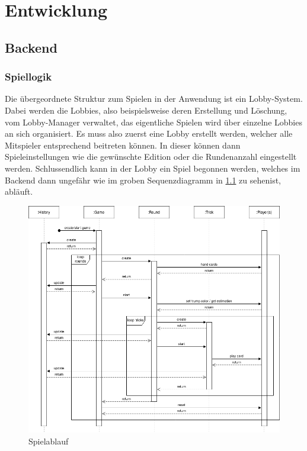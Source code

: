 \chapter{Entwicklung}

\section{Backend}

\subsection{Spiellogik}

Die übergeordnete Struktur zum Spielen in der Anwendung ist ein Lobby-System. Dabei werden die Lobbies, also beispielsweise deren Erstellung und Löschung, vom Lobby-Manager verwaltet, das eigentliche Spielen wird über einzelne Lobbies an sich organisiert. Es muss also zuerst eine Lobby erstellt werden, welcher alle Mitspieler entsprechend beitreten können. In dieser können dann Spieleinstellungen wie die gewünschte Edition oder die Rundenanzahl eingestellt werden. Schlussendlich kann in der Lobby ein Spiel begonnen werden, welches im Backend dann ungefähr wie im groben Sequenzdiagramm in \cref{fig:game-flow} zu sehenist, abläuft.

\begin{figure}
	\includegraphics[width=\textwidth]{images/game-flow.png}
	\caption{Spielablauf}
	\label{fig:game-flow}
\end{figure}

